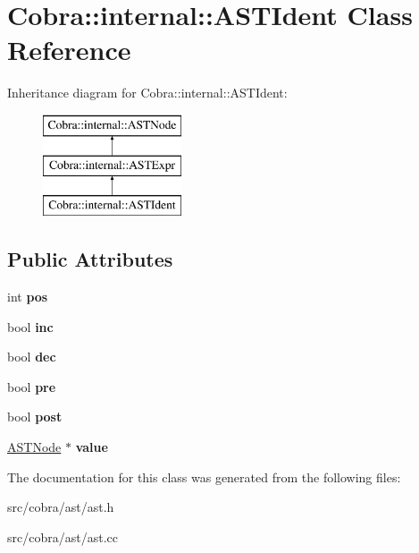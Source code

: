 \hypertarget{class_cobra_1_1internal_1_1_a_s_t_ident}{\section{Cobra\+:\+:internal\+:\+:A\+S\+T\+Ident Class Reference}
\label{class_cobra_1_1internal_1_1_a_s_t_ident}
}
Inheritance diagram for Cobra\+:\+:internal\+:\+:A\+S\+T\+Ident\+:\begin{figure}[H]
\begin{center}
\leavevmode
\includegraphics[height=3.000000cm]{class_cobra_1_1internal_1_1_a_s_t_ident}
\end{center}
\end{figure}
\subsection*{Public Attributes}
\begin{DoxyCompactItemize}
\item 
\hypertarget{class_cobra_1_1internal_1_1_a_s_t_ident_ab097c56a4c95a65cb9d1396fcbfcbca8}{int {\bfseries pos}}\label{class_cobra_1_1internal_1_1_a_s_t_ident_ab097c56a4c95a65cb9d1396fcbfcbca8}

\item 
\hypertarget{class_cobra_1_1internal_1_1_a_s_t_ident_a2cab07f99a65917af3a354f99fbbd763}{bool {\bfseries inc}}\label{class_cobra_1_1internal_1_1_a_s_t_ident_a2cab07f99a65917af3a354f99fbbd763}

\item 
\hypertarget{class_cobra_1_1internal_1_1_a_s_t_ident_a51b08c5ac2daa8c97ad2ccf978b946a4}{bool {\bfseries dec}}\label{class_cobra_1_1internal_1_1_a_s_t_ident_a51b08c5ac2daa8c97ad2ccf978b946a4}

\item 
\hypertarget{class_cobra_1_1internal_1_1_a_s_t_ident_aa159b779de1eeb047d3ba7a0977d4e5f}{bool {\bfseries pre}}\label{class_cobra_1_1internal_1_1_a_s_t_ident_aa159b779de1eeb047d3ba7a0977d4e5f}

\item 
\hypertarget{class_cobra_1_1internal_1_1_a_s_t_ident_a0183fff508335a94f78c6ea6050b1574}{bool {\bfseries post}}\label{class_cobra_1_1internal_1_1_a_s_t_ident_a0183fff508335a94f78c6ea6050b1574}

\item 
\hypertarget{class_cobra_1_1internal_1_1_a_s_t_ident_a95f693066082ffed605899d41f37c3a5}{\hyperlink{class_cobra_1_1internal_1_1_a_s_t_node}{A\+S\+T\+Node} $\ast$ {\bfseries value}}\label{class_cobra_1_1internal_1_1_a_s_t_ident_a95f693066082ffed605899d41f37c3a5}

\end{DoxyCompactItemize}


The documentation for this class was generated from the following files\+:\begin{DoxyCompactItemize}
\item 
src/cobra/ast/ast.\+h\item 
src/cobra/ast/ast.\+cc\end{DoxyCompactItemize}
